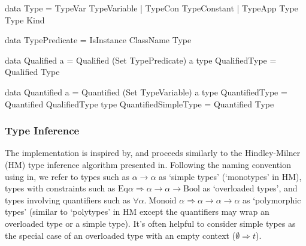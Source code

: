 \documentclass[dissertation.tex]{subfiles}
\begin{document}
{{\begin{haskellfigure}
        data Type = TypeVar TypeVariable
                  | TypeCon TypeConstant
                  | TypeApp Type Type Kind


        data TypePredicate = IsInstance ClassName Type

        data Qualified a = Qualified (Set TypePredicate) a
        type QualifiedType = Qualified Type

        data Quantified a = Quantified (Set TypeVariable) a
        type QuantifiedType = Quantified QualifiedType
        type QuantifiedSimpleType = Quantified Type
        \end{haskellfigure}





        \subsubsection{Type Inference}
        {


            The implementation is inspired by\cite{THIH}, and proceeds similarly to the Hindley-Milner (HM) type
            inference algorithm presented in\cite{HM-rules}. Following the naming convention using in\cite{THIH}, we
            refer to types such as \(\alpha\rightarrow\alpha\) as `simple types' (`monotypes' in HM), types with
            constraints such as \(\text{Eq}\alpha \Rightarrow \alpha\rightarrow\alpha\rightarrow\text{Bool}\) as
            `overloaded types', and types involving quantifiers such as \(\forall\alpha.\;\text{Monoid }\alpha
            \Rightarrow \alpha\rightarrow\alpha\rightarrow\alpha\) as `polymorphic types' (similar to `polytypes' in HM
            except the quantifiers may wrap an overloaded type or a simple type). It's often helpful to consider simple
            types as the special case of an overloaded type with an empty context (\(\emptyset \Rightarrow t\)).
            
}}}
\end{document}
